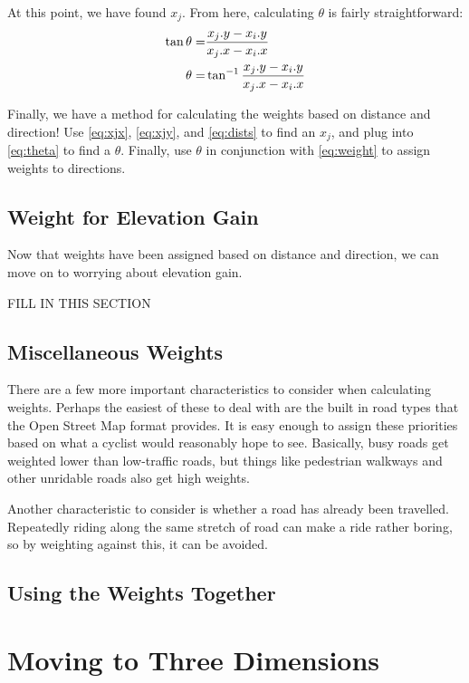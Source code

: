 \documentclass[twocolumn,11pt]{article}
\begin{document}
At this point, we have found $x_j$. From here, calculating $\theta$ is fairly
straightforward:
\begin{align}
  \tan \theta = & \frac{x_j.y - x_i.y}{x_j.x-x_i.x} \notag \\
  \theta = & \tan^{-1} \frac{x_j.y - x_i.y}{x_j.x-x_i.x} \label{eq:theta}
\end{align}

Finally, we have a method for calculating the weights based on distance and
direction! Use \eqref{eq:xjx}, \eqref{eq:xjy}, and \eqref{eq:dists} to find
an $x_j$, and plug into \eqref{eq:theta} to find a $\theta$. Finally, use
$\theta$ in conjunction with \eqref{eq:weight} to assign weights to
directions.

\subsection{Weight for Elevation Gain}

Now that weights have been assigned based on distance and direction, we can
move on to worrying about elevation gain.

FILL IN THIS SECTION

\subsection{Miscellaneous Weights}

There are a few more important characteristics to consider when calculating
weights. Perhaps the easiest of these to deal with are the built in road types
that the Open Street Map format provides. It is easy enough to assign these
priorities based on what a cyclist would reasonably hope to see. Basically,
busy roads get weighted lower than low-traffic roads, but things like
pedestrian walkways and other unridable roads also get high weights.

Another characteristic to consider is whether a road has already been
travelled. Repeatedly riding along the same stretch of road can make a ride
rather boring, so by weighting against this, it can be avoided.

\subsection{Using the Weights Together}

\section{Moving to Three Dimensions} \label{sec:latlong}
\end{document}
